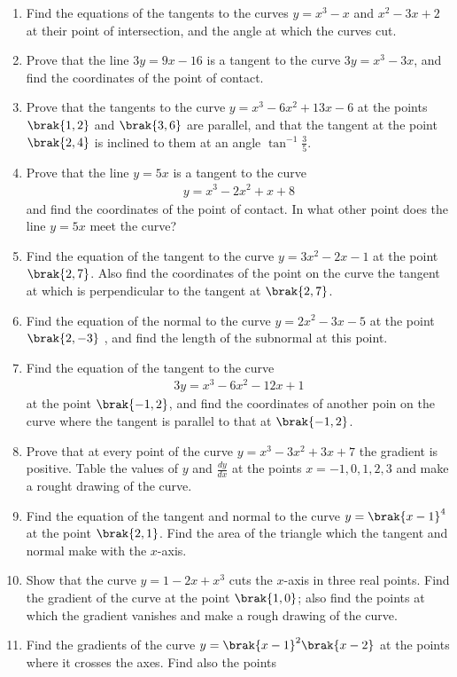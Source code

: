 \begin{enumerate}[1.]
\item Find the equations of the tangents to the curves $y=x^3-x$ and $x^2-3x+2$ at their point of intersection, and the angle at which the
curves cut.
\item Prove that the line $3y=9x-16$ is a tangent to the curve $3y=x^3-3x$, and find the coordinates of the 
point of contact.
\item Prove that the tangents to the curve $y=x^3-6x^2+13x-6$ at the points $\brak{1,2}$ and $\brak{3,6}$ are parallel, and that
the tangent at the point $\brak{2,4}$ is inclined to them at an angle $\tan^{-1}\frac{3}{5}$.
\item Prove that the line $y=5x$ is a tangent to the curve
\begin{align*}
y=x^3-2x^2+x+8
\end{align*}
and find the coordinates of the point of contact.  In what other point does the line $y=5x$ meet the curve?
\item Find the equation of the tangent to the curve $y=3x^2-2x-1$ at the point $\brak{2,7}$.  Also find the coordinates of the point on the curve the tangent
at which is perpendicular to the tangent at $\brak{2,7}$.
\item Find the equation of the normal to the curve $y=2x^2-3x-5$ at the point $\brak{2,-3}$ , and find the length of the subnormal at this point.
\item Find the equation of the tangent to the curve
\begin{align*}
3y=x^3-6x^2-12x+1
\end{align*}
at the point $\brak{-1,2}$, and find the coordinates of another poin on the curve where the tangent
is parallel to that at $\brak{-1,2}$.
\item Prove that at every point of the curve $y=x^3-3x^2+3x+7$ the gradient is positive.  Table the values of $y$ and $\frac{dy}{dx}$ at the points
$x=-1,0,1,2,3$ and make a rought drawing of the curve.
\item Find the equation of the tangent and normal to the curve $y=\brak{x-1}^4$ at the point $\brak{2,1}$.  Find the area of the triangle
which the tangent and normal make with the $x$-axis.
\item Show that the curve $y=1-2x+x^3$ cuts the $x$-axis in three real points.  Find the gradient of the curve
at the point $\brak{1,0}$; also find the points at which the gradient vanishes and make a rough drawing of 
the curve.
\item Find the gradients of the curve $y=\brak{x-1}^2\brak{x-2}$ at the points where it crosses the axes.  Find also the points

\end{enumerate}
